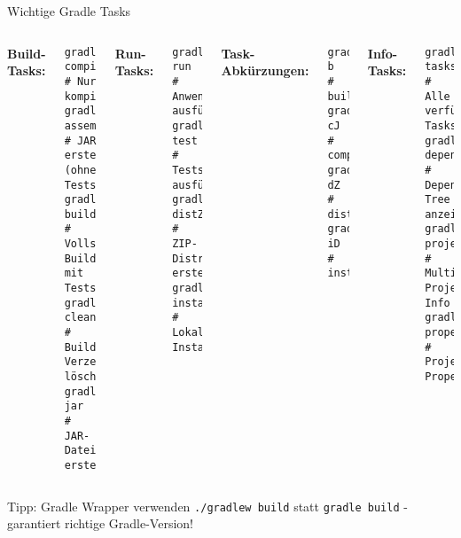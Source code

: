 \begin{frame}[fragile]{Wichtige Gradle Tasks}
  \begin{columns}[T]
    \textbf{Build-Tasks:}
    \begin{lstlisting}[style=java, basicstyle=\tiny\ttfamily, language={}]
gradle compile          # Nur kompilieren
gradle assemble         # JAR erstellen (ohne Tests)
gradle build            # Vollständiger Build mit Tests
gradle clean            # Build-Verzeichnis löschen
gradle jar              # JAR-Datei erstellen
    \end{lstlisting}

    \textbf{Run-Tasks:}
    \begin{lstlisting}[style=java, basicstyle=\tiny\ttfamily, language={}]
gradle run              # Anwendung ausführen
gradle test             # Tests ausführen
gradle distZip          # ZIP-Distribution erstellen
gradle installDist      # Lokale Installation
    \end{lstlisting}

    \textbf{Task-Abkürzungen:}
    \begin{lstlisting}[style=java, basicstyle=\tiny\ttfamily, language={}]
gradle b                # build
gradle cJ               # compileJava
gradle dZ               # distZip
gradle iD               # installDist
    \end{lstlisting}

    \textbf{Info-Tasks:}
    \begin{lstlisting}[style=java, basicstyle=\tiny\ttfamily, language={}]
gradle tasks            # Alle verfügbaren Tasks
gradle dependencies     # Dependency-Tree anzeigen
gradle projects         # Multi-Project Info
gradle properties       # Projekt-Properties
    \end{lstlisting}
  \end{columns}

  \begin{alertblock}{Tipp: Gradle Wrapper verwenden}
    \texttt{./gradlew build} statt \texttt{gradle build} - garantiert richtige Gradle-Version!
  \end{alertblock}
\end{frame}

